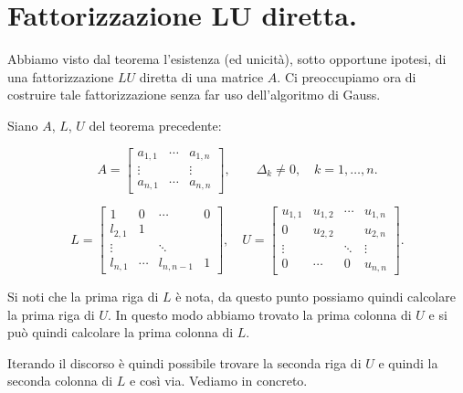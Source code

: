 \section{Fattorizzazione LU diretta.}

Abbiamo visto dal teorema \cite{teo4.4} l'esistenza (ed unicità), sotto opportune ipotesi, di
una fattorizzazione $LU$ diretta di una matrice $A$. Ci preoccupiamo ora di costruire
tale fattorizzazione senza far uso dell'algoritmo di Gauss.

Siano $A$, $L$, $U$ del teorema precedente:

\[
A =
\left[
\begin{array}{ccc}
a_{1,1} & \cdots & a_{1,n} \\
\vdots & & \vdots \\
a_{n,1} & \cdots & a_{n,n}
\end{array}
\right], \qquad
\Delta_k \neq 0, \quad k = 1, \ldots, n.
\]

\[
L =
\left[
\begin{array}{cccc}
1 & 0 & \cdots & 0 \\
l_{2,1} & 1 & & \\
\vdots & & \ddots & \\
l_{n,1} & \cdots & l_{n, n-1} & 1
\end{array}
\right], \quad
U =
\left[
\begin{array}{cccc}
u_{1,1} & u_{1,2} & \cdots & u_{1,n} \\
0 & u_{2,2} & & u_{2,n} \\
\vdots & &\ddots & \vdots \\
0 & \cdots & 0 & u_{n,n}
\end{array}
\right].
\]

Si noti che la prima riga di $L$ è nota, da questo punto possiamo quindi
calcolare la prima riga di $U$. In questo modo abbiamo trovato la prima
colonna di $U$ e si può quindi calcolare la prima colonna di $L$.

Iterando il discorso è quindi possibile trovare la seconda riga di $U$ e
quindi la seconda colonna di $L$ e così via. Vediamo in concreto.

